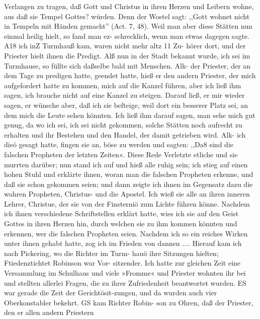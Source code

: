 Verlangen zu tragen, daß Gott und Christus in ihren Herzen
und Leibern wohne, aus daß sie Tempel Gottes? würden. Denn
der Wostel sagt: ,,Gott wohnet nicht in Tempeln mit Händen
gemacht'' (Act. 7, 48). Weil man aber diese Stätten nun einmal
heilig hielt, so fand man ez- schrecklich, wenn man etwas dagegen
sagte. A18 ich inZ Turmhauß kam, waren nicht mehr altz 11 Zu-
hörer dort, und der Priester hielt ihnen die Predigt. Alß nun
in der Stadt bekannt wurde, ich sei im Turmhause, so füllte sich
daßselbe bald mit Menschen. Alk- der Priester, der an dem Tage
zu predigen hatte, geendet hatte, hieß er den andern Priester, der
mich aufgefordert hatte zu kommen, mich auf die Kanzel führen,
aber ich ließ ihm sagen, ich brauche nicht auf eine Kanzel zu
steigen. Darauf ließ, er mir wieder sagen, er wünsche aber, daß
ich sie befteige, weil dort ein besserer Platz sei, an dem mich die
Leute sehen könnten. Ich ließ ihm darauf sagen, man sehe mich
gut genug, da wo ich sei, ich sei nicht gekommen, solche Stätten
noch aufrecht zu erhalten und ihr Bestehen und den Handel, der
damit getrieben wird. Alk- ich dieö gesagt hatte, fingen sie an,
böse zu werden und sagten: ,,Da8 sind die falschen Propheten
der letzten Zeiten«. Diese Rede Verletzte etliche und sie murrten
darüber; nun stand ich auf und hieß alle ruhig sein; ich stieg
auf einen hohen Stuhl und erklärte ihnen, woran man die falschen
Propheten erkenne, und daß sie schon gekommen seien; und dann
zeigte ich ihnen im Gegensatz dazu die wahren Propheten, Christus-
und die Apostel. Ich wieß sie alle an ihren inneren Lehrer,
Christue, der sie von der Finsterniö zum Lichte führen könne.
Nachdem ich ihnen verschiedene Schriftstellen erklärt hatte, wies
ich sie auf den Geist Gottes in ihren Herzen hin, durch welchen
sie zu ihm kommen könnten und erkennen, wer die falschen
Propheten seien. Nachdem ich so ein reiches Wirken unter ihnen
gehabt hatte, zog ich im Frieden von dannen ....
Hierauf kam ich nach Pickering, wo die Richter im Turm-
hauö ihre Sitzungen hielten; Ftiedenztichtet Robinson war Vor-
sitzender. Ich hatte zur gleichen Zeit eine Versammlung im
Schulhaus und viele »Fromme« und Priester wohnten ihr bei
und stellten allerlei Fragen, die zu ihrer Zufriedenheit beantwortet
wurden. ES war gerade die Zeit der Gerichtösit-zungen, und da
wurden auch vier Oberkonstabler bekehrt. GS kam Richter Robin-
son zu Ohren, daß der Priester, den er allen andern Priestern


